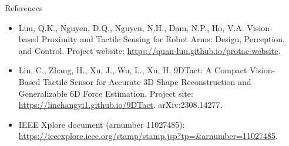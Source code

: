 \documentclass[final]{beamer}
\newlength{\sepwidth}
\newlength{\colwidth}
\newcommand{\separatorcolumn}{\begin{column}{\sepwidth}\end{column}}
\begin{document}
\begin{frame}[t]
\begin{columns}[t]
\begin{column}{\colwidth}
  \begin{block}{References} 
    \footnotesize
    \begin{itemize}
      \item Luu, Q.K., Nguyen, D.Q., Nguyen, N.H., Dam, N.P., Ho, V.A. Vision-based Proximity and Tactile Sensing for Robot Arms: Design, Perception, and Control. Project website: \href{https://quan-luu.github.io/protac-website}{https://quan-luu.github.io/protac-website}.
      \item Lin, C., Zhang, H., Xu, J., Wu, L., Xu, H. 9DTact: A Compact Vision-Based Tactile Sensor for Accurate 3D Shape Reconstruction and Generalizable 6D Force Estimation. Project site: \href{https://linchangyi1.github.io/9DTact}{https://linchangyi1.github.io/9DTact}. arXiv:2308.14277.
      \item IEEE Xplore document (arnumber 11027485): \url{https://ieeexplore.ieee.org/stamp/stamp.jsp?tp=&arnumber=11027485}.
    \end{itemize}
  \end{block}

\end{column}
\separatorcolumn



\end{columns}
\end{frame}
\end{document}
